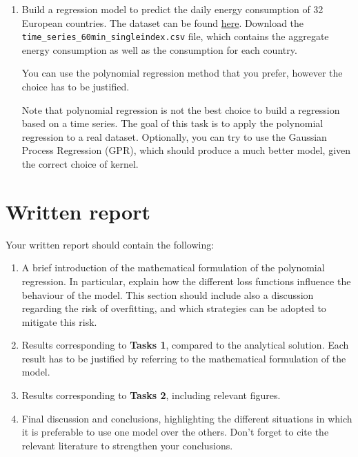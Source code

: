 \documentclass[11pt]{article}
\begin{document}
\begin{enumerate}[start=1,label={\bfseries Task \arabic*:}]
\item Build a regression model to predict the daily energy consumption of 32 European countries. The dataset can be found \href{https://data.open-power-system-data.org/time_series/2020-10-06}{here}. Download the \verb|time_series_60min_singleindex.csv| file, which contains the aggregate energy consumption as well as the consumption for each country.  \par
You can use the polynomial regression method that you prefer, however the choice has to be justified. \par
Note that polynomial regression is not the best choice to build a regression based on a time series. The goal of this task is to apply the polynomial regression to a real dataset. Optionally, you can try to use the Gaussian Process Regression (GPR), which should produce a much better model, given the correct choice of kernel.


\end{enumerate}

\section*{Written report}

Your written report should contain the following:

\begin{enumerate}[start=1,label={\bfseries Section \arabic*:}]
\item A brief introduction of the mathematical formulation of the polynomial regression. In particular, explain how the different loss functions influence the behaviour of the model. This section should include also a discussion regarding the risk of overfitting, and which strategies can be adopted to mitigate this risk.
\item Results corresponding to \textbf{Tasks 1}, compared to the analytical solution. Each result has to be justified by referring to the mathematical formulation of the model.
\item Results corresponding to \textbf{Tasks 2}, including relevant figures.
\item Final discussion and conclusions, highlighting the different situations in which it is preferable to use one model over the others. Don't forget to cite the relevant literature to strengthen your conclusions. 
\end{enumerate}
\end{document}
